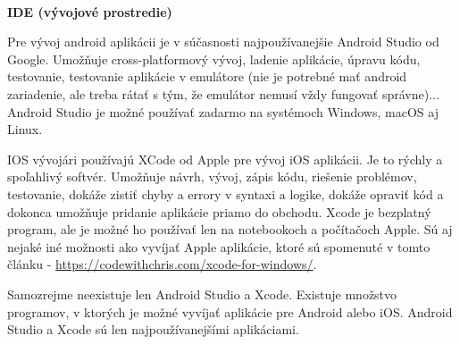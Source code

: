 \documentclass[10pt,twoside,slovak,a4paper]{article}
\begin{document}
\cite{eYewated2, openxcell, W2S, appleglitz}
\\	%


\textbf{IDE (vývojové prostredie)}

Pre vývoj android aplikácii je v súčasnosti najpoužívanejšie Android Studio od Google. Umožňuje cross-platformový vývoj, ladenie aplikácie, úpravu kódu, testovanie, testovanie aplikácie v emulátore (nie je potrebné mať android zariadenie, ale treba rátať s tým, že emulátor nemusí vždy fungovať správne)... Android Studio je možné používať zadarmo na systémoch Windows, macOS aj Linux.

IOS vývojári používajú XCode od Apple pre vývoj iOS aplikácii. Je to rýchly a spoľahlivý softvér. Umožňuje návrh, vývoj, zápis kódu, riešenie problémov, testovanie, dokáže zistiť chyby a errory v syntaxi a logike, dokáže opraviť kód a dokonca umožňuje pridanie aplikácie priamo do obchodu. Xcode je bezplatný program, ale je možné ho používať len na notebookoch a počítačoch Apple. Sú aj nejaké iné možnosti ako vyvíjať Apple aplikácie, ktoré sú spomenuté v tomto článku - \url{https://codewithchris.com/xcode-for-windows/}.

\cite{eliteml, EGO, DDI}

Samozrejme neexistuje len Android Studio a Xcode. Existuje množstvo programov, v ktorých je možné vyvíjať aplikácie pre Android alebo iOS. Android Studio a Xcode sú len najpoužívanejšími aplikáciami.
\\	%
\end{document}
